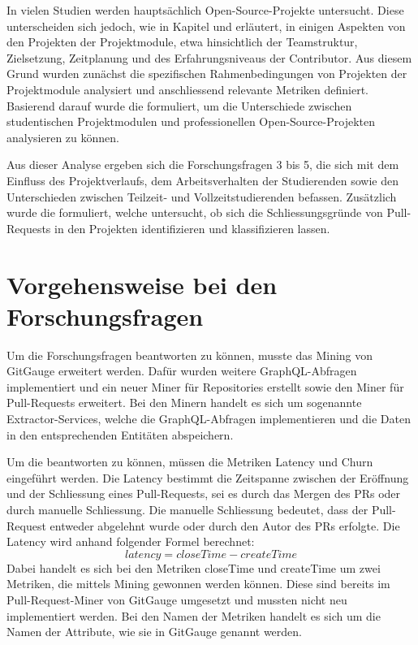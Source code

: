 In vielen Studien werden hauptsächlich Open-Source-Projekte untersucht. Diese unterscheiden sich jedoch, wie in Kapitel  und  erläutert, in einigen Aspekten von den Projekten der Projektmodule, etwa hinsichtlich der Teamstruktur, Zielsetzung, Zeitplanung und des Erfahrungsniveaus der Contributor.
Aus diesem Grund wurden zunächst die spezifischen Rahmenbedingungen von Projekten der Projektmodule analysiert und anschliessend relevante Metriken definiert. Basierend darauf wurde die  formuliert, um die Unterschiede zwischen studentischen Projektmodulen und professionellen Open-Source-Projekten analysieren zu können.

Aus dieser Analyse ergeben sich die Forschungsfragen 3 bis 5, die sich mit dem Einfluss des Projektverlaufs, dem Arbeitsverhalten der Studierenden sowie den Unterschieden zwischen Teilzeit- und Vollzeitstudierenden befassen. Zusätzlich wurde die  formuliert, welche untersucht, ob sich die Schliessungsgründe von Pull-Requests in den Projekten identifizieren und klassifizieren lassen. 

\section{Vorgehensweise bei den For\-schungs\-fragen}
\label{sec:AnalyseChurnvsLatency}
\label{sec:Metriken}
Um die Forschungsfragen beantworten zu können, musste das Mining von GitGauge erweitert werden. Dafür wurden weitere GraphQL-Abfragen implementiert und ein neuer Miner für Repositories erstellt sowie den Miner für Pull-Requests erweitert. Bei den Minern handelt es sich um sogenannte Extractor-Services, welche die GraphQL-Abfragen implementieren und die Daten in den entsprechenden Entitäten abspeichern.

Um die  beantworten zu können, müssen die Metriken Latency und Churn eingeführt werden. Die Latency bestimmt die Zeitspanne zwischen der Eröffnung und der Schliessung eines Pull-Requests, sei es durch das Mergen des PRs oder durch manuelle Schliessung. Die manuelle Schliessung bedeutet, dass der Pull-Request entweder abgelehnt wurde oder durch den Autor des PRs erfolgte. Die Latency wird anhand folgender Formel berechnet:
\begin{equation}
latency = closeTime - createTime
\end{equation}
Dabei handelt es sich bei den Metriken closeTime und createTime um zwei Metriken, die mittels Mining gewonnen werden können. Diese sind bereits im Pull-Request-Miner von GitGauge umgesetzt und mussten nicht neu implementiert werden. Bei den Namen der Metriken handelt es sich um die Namen der Attribute, wie sie in GitGauge genannt werden.

